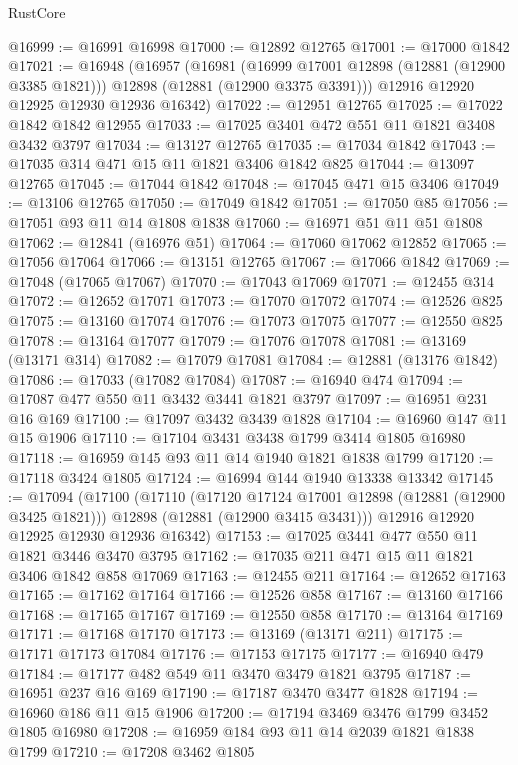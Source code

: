 \begin{lexlean}{RustCore}
\begin{coremodule}
@16999 := @16991 @16998
@17000 := @12892 @12765
@17001 := @17000 @1842
@17021 := @16948
    (@16957
      (@16981
        (@16999 @17001 @12898 (@12881 (@12900 @3385 @1821)))
        @12898
        (@12881 (@12900 @3375 @3391)))
      @12916
      @12920
      @12925
      @12930
      @12936
      @16342)
@17022 := @12951 @12765
@17025 := @17022 @1842 @1842 @12955
@17033 := @17025 @3401 @472 @551 @11 @1821 @3408 @3432 @3797
@17034 := @13127 @12765
@17035 := @17034 @1842
@17043 := @17035 @314 @471 @15 @11 @1821 @3406 @1842 @825
@17044 := @13097 @12765
@17045 := @17044 @1842
@17048 := @17045 @471 @15 @3406
@17049 := @13106 @12765
@17050 := @17049 @1842
@17051 := @17050 @85
@17056 := @17051 @93 @11 @14 @1808 @1838
@17060 := @16971 @51 @11 @51 @1808
@17062 := @12841 (@16976 @51)
@17064 := @17060 @17062 @12852
@17065 := @17056 @17064
@17066 := @13151 @12765
@17067 := @17066 @1842
@17069 := @17048 (@17065 @17067)
@17070 := @17043 @17069
@17071 := @12455 @314
@17072 := @12652 @17071
@17073 := @17070 @17072
@17074 := @12526 @825
@17075 := @13160 @17074
@17076 := @17073 @17075
@17077 := @12550 @825
@17078 := @13164 @17077
@17079 := @17076 @17078
@17081 := @13169 (@13171 @314)
@17082 := @17079 @17081
@17084 := @12881 (@13176 @1842)
@17086 := @17033 (@17082 @17084)
@17087 := @16940 @474
@17094 := @17087 @477 @550 @11 @3432 @3441 @1821 @3797
@17097 := @16951 @231 @16 @169
@17100 := @17097 @3432 @3439 @1828
@17104 := @16960 @147 @11 @15 @1906
@17110 := @17104 @3431 @3438 @1799 @3414 @1805 @16980
@17118 := @16959 @145 @93 @11 @14 @1940 @1821 @1838 @1799
@17120 := @17118 @3424 @1805
@17124 := @16994 @144 @1940 @13338 @13342
@17145 := @17094
    (@17100
      (@17110
        (@17120 @17124 @17001 @12898 (@12881 (@12900 @3425 @1821)))
        @12898
        (@12881 (@12900 @3415 @3431)))
      @12916
      @12920
      @12925
      @12930
      @12936
      @16342)
@17153 := @17025 @3441 @477 @550 @11 @1821 @3446 @3470 @3795
@17162 := @17035 @211 @471 @15 @11 @1821 @3406 @1842 @858 @17069
@17163 := @12455 @211
@17164 := @12652 @17163
@17165 := @17162 @17164
@17166 := @12526 @858
@17167 := @13160 @17166
@17168 := @17165 @17167
@17169 := @12550 @858
@17170 := @13164 @17169
@17171 := @17168 @17170
@17173 := @13169 (@13171 @211)
@17175 := @17171 @17173 @17084
@17176 := @17153 @17175
@17177 := @16940 @479
@17184 := @17177 @482 @549 @11 @3470 @3479 @1821 @3795
@17187 := @16951 @237 @16 @169
@17190 := @17187 @3470 @3477 @1828
@17194 := @16960 @186 @11 @15 @1906
@17200 := @17194 @3469 @3476 @1799 @3452 @1805 @16980
@17208 := @16959 @184 @93 @11 @14 @2039 @1821 @1838 @1799
@17210 := @17208 @3462 @1805

\end{coremodule}
\end{lexlean}
